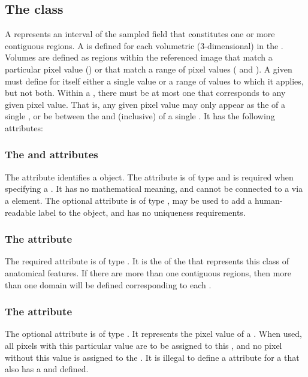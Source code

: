 \subsection{The  class}
\label{sampledvolume-class}
A \SampledVolume represents an interval of the sampled field that constitutes one or more contiguous regions. A \SampledVolume is defined for each volumetric (3-dimensional) \Domain in the \Geometry. Volumes are defined as regions within the referenced image that match a particular pixel value () or that match a range of pixel values ( and ).  A given \SampledVolume must define for itself either a single value or a range of values to which it applies, but not both.  Within a \ListOfSampledVolumes, there must be at most one \SampledVolume that corresponds to any given pixel value.  That is, any given pixel value may only appear as the  of a single \SampledVolume, or be between the  and  (inclusive) of a single \SampledVolume.  It has the following attributes:

\subsubsection{The \fixttspace{} and \fixttspace{} attributes}
The  attribute identifies a \SampledVolume object. The attribute is of type  and is required when specifying a \SampledVolume.  It has no mathematical meaning, and cannot be connected to a \Parameter via a \SpatialSymbolReference element.  The optional  attribute is of type , may be used to add a human-readable label to the object, and has no uniqueness requirements.

\subsubsection{The \fixttspace{} attribute}
The required  attribute is of type . It is the  of the \DomainType that represents this class of anatomical features. If there are more than one contiguous regions, then more than one domain will be defined corresponding to each \SampledVolume.

\subsubsection{The \fixttspace{} attribute}
The optional  attribute is of type . It represents the pixel value of a \SampledVolume.  When used, all pixels with this particular value are to be assigned to this \SampledVolume, and no pixel without this value is assigned to the \SampledVolume.  It is illegal to define a  attribute for a \SampledVolume that also has a  and  defined.

